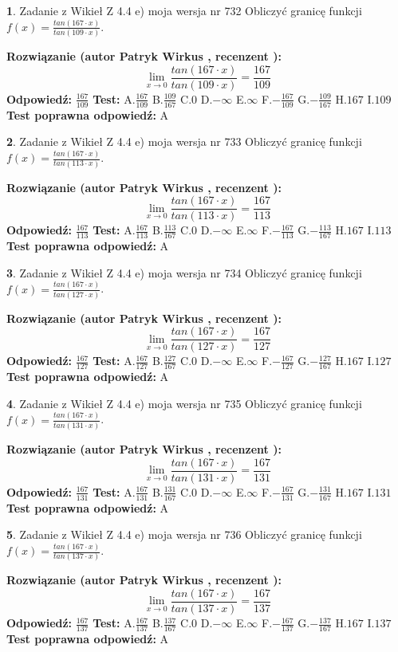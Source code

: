 \documentclass[12pt, a4paper]{article}
\theoremstyle{definition} %
\newtheorem{zad}{}
\newcommand{\zadStart}[1]{\begin{zad}#1\newline}
\newcommand{\zadStop}{\end{zad}}
\newcommand{\rozwStart}[2]{\noindent \textbf{Rozwiązanie (autor #1 , recenzent #2): }\newline}
\newcommand{\rozwStop}{\newline}
\newcommand{\odpStart}{\noindent \textbf{Odpowiedź:}\newline}
\newcommand{\odpStop}{\newline}
\newcommand{\testStart}{\noindent \textbf{Test:}\newline}
\newcommand{\testStop}{\newline}
\newcommand{\kluczStart}{\noindent \textbf{Test poprawna odpowiedź:}\newline}
\newcommand{\kluczStop}{\newline}
\begin{document}
\zadStart{Zadanie z Wikieł Z 4.4 e) moja wersja nr 732}
Obliczyć granicę funkcji $f(x)=\frac{tan(167\cdot x)}{tan(109\cdot x)}$.
\zadStop
\rozwStart{Patryk Wirkus}{}
$$\lim\limits_{x\to 0}\frac{tan(167\cdot x)}{tan(109\cdot x)}=
\frac{167}{109}$$
\rozwStop
\odpStart
$\frac{167}{109}$
\odpStop
\testStart
A.$\frac{167}{109}$
B.$\frac{109}{167}$
C.$0$
D.$-\infty$
E.$\infty$
F.$-\frac{167}{109}$
G.$-\frac{109}{167}$
H.$167$
I.$109$
\testStop
\kluczStart
A
\kluczStop



\zadStart{Zadanie z Wikieł Z 4.4 e) moja wersja nr 733}
Obliczyć granicę funkcji $f(x)=\frac{tan(167\cdot x)}{tan(113\cdot x)}$.
\zadStop
\rozwStart{Patryk Wirkus}{}
$$\lim\limits_{x\to 0}\frac{tan(167\cdot x)}{tan(113\cdot x)}=
\frac{167}{113}$$
\rozwStop
\odpStart
$\frac{167}{113}$
\odpStop
\testStart
A.$\frac{167}{113}$
B.$\frac{113}{167}$
C.$0$
D.$-\infty$
E.$\infty$
F.$-\frac{167}{113}$
G.$-\frac{113}{167}$
H.$167$
I.$113$
\testStop
\kluczStart
A
\kluczStop



\zadStart{Zadanie z Wikieł Z 4.4 e) moja wersja nr 734}
Obliczyć granicę funkcji $f(x)=\frac{tan(167\cdot x)}{tan(127\cdot x)}$.
\zadStop
\rozwStart{Patryk Wirkus}{}
$$\lim\limits_{x\to 0}\frac{tan(167\cdot x)}{tan(127\cdot x)}=
\frac{167}{127}$$
\rozwStop
\odpStart
$\frac{167}{127}$
\odpStop
\testStart
A.$\frac{167}{127}$
B.$\frac{127}{167}$
C.$0$
D.$-\infty$
E.$\infty$
F.$-\frac{167}{127}$
G.$-\frac{127}{167}$
H.$167$
I.$127$
\testStop
\kluczStart
A
\kluczStop



\zadStart{Zadanie z Wikieł Z 4.4 e) moja wersja nr 735}
Obliczyć granicę funkcji $f(x)=\frac{tan(167\cdot x)}{tan(131\cdot x)}$.
\zadStop
\rozwStart{Patryk Wirkus}{}
$$\lim\limits_{x\to 0}\frac{tan(167\cdot x)}{tan(131\cdot x)}=
\frac{167}{131}$$
\rozwStop
\odpStart
$\frac{167}{131}$
\odpStop
\testStart
A.$\frac{167}{131}$
B.$\frac{131}{167}$
C.$0$
D.$-\infty$
E.$\infty$
F.$-\frac{167}{131}$
G.$-\frac{131}{167}$
H.$167$
I.$131$
\testStop
\kluczStart
A
\kluczStop



\zadStart{Zadanie z Wikieł Z 4.4 e) moja wersja nr 736}
Obliczyć granicę funkcji $f(x)=\frac{tan(167\cdot x)}{tan(137\cdot x)}$.
\zadStop
\rozwStart{Patryk Wirkus}{}
$$\lim\limits_{x\to 0}\frac{tan(167\cdot x)}{tan(137\cdot x)}=
\frac{167}{137}$$
\rozwStop
\odpStart
$\frac{167}{137}$
\odpStop
\testStart
A.$\frac{167}{137}$
B.$\frac{137}{167}$
C.$0$
D.$-\infty$
E.$\infty$
F.$-\frac{167}{137}$
G.$-\frac{137}{167}$
H.$167$
I.$137$
\testStop
\kluczStart
A
\kluczStop
\end{document}
